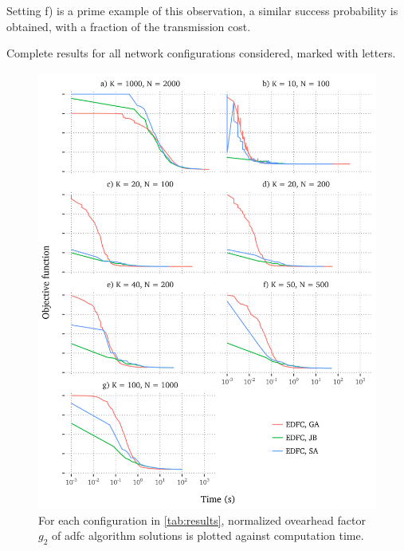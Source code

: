 \documentclass[12pt,journal,draftclsnofoot,onecolumn]{IEEEtran}
\begin{document}
Setting f) is a prime example of this observation, a similar success probability is obtained, with a fraction of the transmission cost.

\clearpage
\begin{table}[htp]
	\centering
	
	\caption{Complete results for all network configurations considered, marked with letters.}
	\label{tab:results}
\end{table}

\begin{figure}[htp]
	\includegraphics[]{figures/progress-edfc.png}
	\caption{For each configuration in \autoref{tab:results}, normalized ovearhead factor $g_2$ of \gls{adfc} algorithm solutions is plotted against computation time.}
	\label{fig:progress-edfc}
\end{figure}
\end{document}
